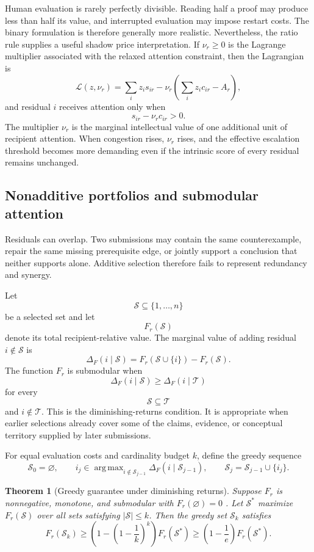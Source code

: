 \documentclass[11pt]{article}
\newtheorem{theorem}[definition]{Theorem}
\theoremstyle{definition}
\DeclareMathOperator{\argmax}{arg\,max}
\begin{document}
Human evaluation is rarely perfectly divisible. Reading half a proof may produce less than half its value, and interrupted evaluation may impose restart costs. The binary formulation is therefore generally more realistic. Nevertheless, the ratio rule supplies a useful shadow price interpretation. If \(\nu_r\geq0\) is the Lagrange multiplier associated with the relaxed attention constraint, then the Lagrangian is
\[
\mathcal{L}(z,\nu_r)
=
\sum_i z_i s_{ir}
-
\nu_r
\left(
\sum_i z_i c_{ir}-A_r
\right),
\]
and residual \(i\) receives attention only when
\[
s_{ir}-\nu_r c_{ir}>0.
\]
The multiplier \(\nu_r\) is the marginal intellectual value of one additional unit of recipient attention. When congestion rises, \(\nu_r\) rises, and the effective escalation threshold becomes more demanding even if the intrinsic score of every residual remains unchanged.

\subsection{Nonadditive portfolios and submodular attention}

Residuals can overlap. Two submissions may contain the same counterexample, repair the same missing prerequisite edge, or jointly support a conclusion that neither supports alone. Additive selection therefore fails to represent redundancy and synergy.

Let
\[
\mathcal{S}\subseteq\{1,\dots,n\}
\]
be a selected set and let
\[
F_r(\mathcal{S})
\]
denote its total recipient-relative value. The marginal value of adding residual \(i\notin\mathcal{S}\) is
\[
\Delta_F(i\mid\mathcal{S})
=
F_r(\mathcal{S}\cup\{i\})-F_r(\mathcal{S}).
\]
The function \(F_r\) is submodular when
\[
\Delta_F(i\mid\mathcal{S})
\geq
\Delta_F(i\mid\mathcal{T})
\]
for every
\[
\mathcal{S}\subseteq\mathcal{T}
\]
and \(i\notin\mathcal{T}\). This is the diminishing-returns condition. It is appropriate when earlier selections already cover some of the claims, evidence, or conceptual territory supplied by later submissions.

For equal evaluation costs and cardinality budget \(k\), define the greedy sequence
\[
\mathcal{S}_0=\varnothing,
\qquad
i_j
\in
\argmax_{i\notin\mathcal{S}_{j-1}}
\Delta_F(i\mid\mathcal{S}_{j-1}),
\qquad
\mathcal{S}_j
=
\mathcal{S}_{j-1}\cup\{i_j\}.
\]

\begin{theorem}[Greedy guarantee under diminishing returns]
Suppose \(F_r\) is nonnegative, monotone, and submodular with \(F_r(\varnothing)=0\) \cite{nemhauser1978}. Let \(\mathcal{S}^{*}\) maximize \(F_r(\mathcal{S})\) over all sets satisfying \(|\mathcal{S}|\leq k\). Then the greedy set \(\mathcal{S}_k\) satisfies
\[
F_r(\mathcal{S}_k)
\geq
\left(
1-\left(1-\frac{1}{k}\right)^k
\right)
F_r(\mathcal{S}^{*})
\geq
\left(1-\frac{1}{e}\right)
F_r(\mathcal{S}^{*}).
\]
\end{theorem}
\end{document}
